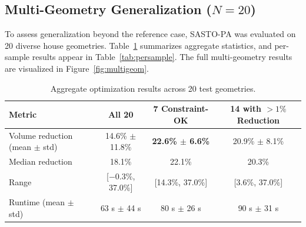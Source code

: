 \documentclass[11pt]{article}
\theoremstyle{plain}
\theoremstyle{definition}
\theoremstyle{remark}
\begin{document}
\subsection{Multi-Geometry Generalization ($N = 20$)}

To assess generalization beyond the reference case, SASTO-PA was evaluated on 20 diverse house geometries. Table~\ref{tab:multigeom} summarizes aggregate statistics, and per-sample results appear in Table~\ref{tab:persample}. The full multi-geometry results are visualized in Figure~\ref{fig:multigeom}.

\begin{table}[t]
\centering
\caption{Aggregate optimization results across 20 test geometries.}
\label{tab:multigeom}
\small
\begin{tabular}{@{}lccc@{}}
\toprule
\textbf{Metric} & \textbf{All 20} & \textbf{7 Constraint-OK} & \textbf{14 with $>{1\%}$ Reduction} \\
\midrule
Volume reduction (mean $\pm$ std) & 14.6\% $\pm$ 11.8\% & \textbf{22.6\% $\pm$ 6.6\%} & 20.9\% $\pm$ 8.1\% \\
Median reduction & 18.1\% & 22.1\% & 20.3\% \\
Range & [$-0.3\%$, 37.0\%] & [14.3\%, 37.0\%] & [3.6\%, 37.0\%] \\
Runtime (mean $\pm$ std) & 63 s $\pm$ 44 s & 80 s $\pm$ 26 s & 90 s $\pm$ 31 s \\
\bottomrule
\end{tabular}
\end{table}
\end{document}
